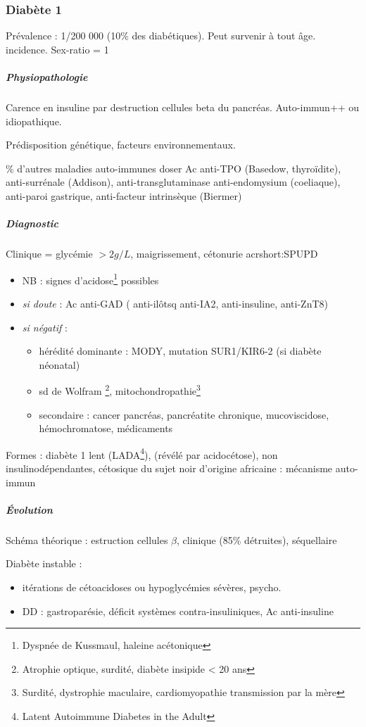 \documentclass[11pt]{article}
\begin{document}
\subsubsection{Diabète 1}
\label{sec:org0c6bf60}
Prévalence : 1/200 000 (10\% des diabétiques). Peut survenir à tout âge. \inc
incidence. Sex-ratio = 1

\subparagraph{Physiopathologie}
\label{sec:orgead90bf}
Carence en insuline par destruction cellules beta du pancréas. Auto-immun++ ou idiopathique.

Prédisposition génétique, facteurs environnementaux.

\% d'autres maladies auto-immunes \thus doser Ac anti-TPO (Basedow,
thyroïdite), anti-surrénale (Addison), anti-transglutaminase \textpm{} anti-endomysium
(coeliaque), anti-paroi gastrique, anti-facteur intrinsèque (Biermer)

\subparagraph{Diagnostic}
\label{sec:orgf864338}
Clinique =  glycémie \(> 2g/L\), maigrissement, cétonurie \textpm{} acrshort:SPUPD
\begin{itemize}
\item NB : signes d'acidose\footnote{Dyspnée de Kussmaul, haleine acétonique} possibles
\item \emph{si doute} : Ac anti-GAD (\textpm{} anti-ilôtsq anti-IA2, anti-insuline, anti-ZnT8)
\item \emph{si négatif} :
\begin{itemize}
\item hérédité dominante : MODY, mutation SUR1/KIR6-2 (si diabète néonatal)
\item sd de Wolfram \footnote{Atrophie optique, surdité, diabète insipide < 20 ans}, mitochondropathie\footnote{Surdité, dystrophie maculaire, cardiomyopathie transmission par la mère}
\item secondaire : cancer pancréas, pancréatite chronique, mucoviscidose, hémochromatose, médicaments
\end{itemize}
\end{itemize}
Formes : diabète 1 lent (LADA\footnote{Latent Autoimmune Diabetes in the Adult}), (révélé par acidocétose), non insulinodépendantes, cétosique du sujet noir d'origine africaine : mécanisme
   auto-immun

\subparagraph{Évolution}
\label{sec:orgf7f4f5b}
Schéma théorique : estruction cellules \(\beta\), clinique (85\% détruites), séquellaire

Diabète instable : 
\begin{itemize}
\item itérations de cétoacidoses ou hypoglycémies sévères, psycho.
\item DD : gastroparésie, déficit systèmes contra-insuliniques, Ac anti-insuline
\end{itemize}
\end{document}
